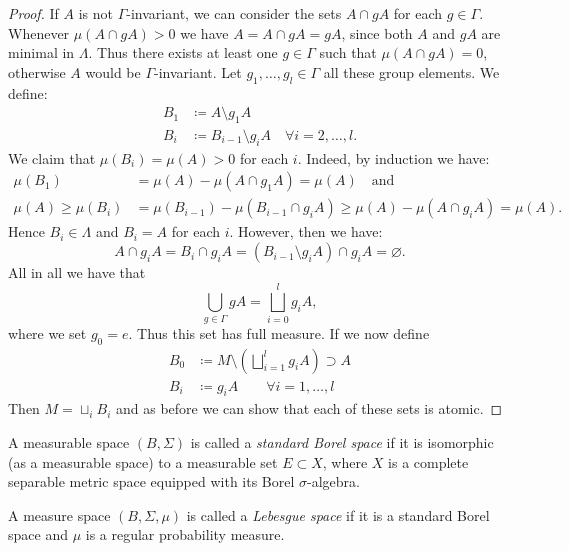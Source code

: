 \begin{proof}
  If \(A\) is not \(\Gamma\)-invariant, we can consider the sets \(A \cap gA\) for each \(g \in \Gamma\). Whenever \(\mu(A \cap gA) > 0\) we have \(A = A \cap gA = gA\), since both \(A\) and \(gA\) are minimal in \(\Lambda\). Thus there exists at least one \(g \in \Gamma\) such that \(\mu(A \cap gA) = 0\), otherwise \(A\) would be \(\Gamma\)-invariant. Let \(g_1, \dots, g_l \in \Gamma\) all these group elements. We define:
  \begin{align*}
    B_1 & \coloneqq A \setminus g_1A\\
    B_i & \coloneqq B_{i-1} \setminus g_i A \quad \forall i = 2, \dots, l.
  \end{align*}
  We claim that \(\mu(B_i) = \mu(A) >0\) for each \(i\). Indeed, by induction we have:
  \begin{align*}
    \mu(B_1) & = \mu(A) - \mu(A \cap g_1A) = \mu(A) \quad \text{and}\\
    \mu(A) \geq \mu(B_i) & = \mu(B_{i-1}) - \mu(B_{i-1} \cap g_iA) \geq \mu(A) - \mu(A \cap g_i A) = \mu(A).
  \end{align*}
  Hence \(B_i \in \Lambda\) and \(B_i = A\) for each \(i\). However, then we have:
  \[
    A \cap g_iA = B_i \cap g_iA = (B_{i-1} \setminus g_iA) \cap g_iA = \varnothing.
  \]
  All in all we have that
  \[
    \bigcup_{g \in \Gamma} gA = \bigsqcup_{i=0}^l g_i A,
  \]
  where we set \(g_0 = e\). Thus this set has full measure. If we now define
  \begin{align*}
    B_0 & \coloneqq M \setminus \left (\bigsqcup_{i=1}^l g_iA \right) \supset A\\
    B_i & \coloneqq g_iA \qquad \forall i = 1, \dots, l
  \end{align*}
  Then \(M = \sqcup_i B_i\) and as before we can show that each of these sets is atomic.
\end{proof}

\begin{defin}
  A measurable space \((B, \Sigma)\) is called a \emph{standard Borel space} if it is isomorphic (as a measurable space) to a measurable set \(E \subset X\), where \(X\) is a complete separable metric space equipped with its Borel \(\sigma\)-algebra.

  A measure space \((B, \Sigma, \mu)\) is called a \emph{Lebesgue space} if it is a standard Borel space and \(\mu\) is a regular probability measure.
\end{defin}

